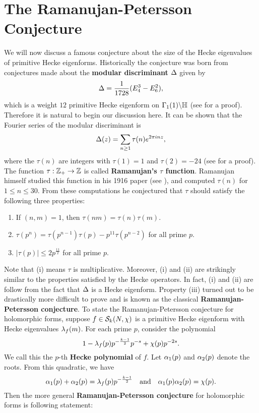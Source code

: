   \section{The Ramanujan-Petersson Conjecture}
    We will now discuss a famous conjecture about the size of the Hecke eigenvalues of primitive Hecke eigenforms. Historically the conjecture was born from conjectures made about the \textbf{modular discriminant} $\Delta$ given by
    \[
      \Delta = \frac{1}{1728}(E_{4}^{3}-E_{6}^{2}),
    \]
    which is a weight $12$ primitive Hecke eigenform on $\Gamma_{1}(1)\backslash\mathbb{H}$ (see \cite{diamond2005first} for a proof). Therefore it is natural to begin our discussion here. It can be shown that the Fourier series of the modular discriminant is
    \[
      \Delta(z) = \sum_{n \ge 1}\tau(n)e^{2\pi i nz},
    \]
    where the $\tau(n)$ are integers with $\tau(1) = 1$ and $\tau(2) = -24$ (see \cite{diamond2005first} for a proof). The function $\tau:\mathbb{Z}_{+} \to \mathbb{Z}$ is called \textbf{Ramanujan's $\tau$ function}. Ramanujan himself studied this function in his 1916 paper (see \cite{ramanujan1916certain}), and computed $\tau(n)$ for $1 \le n \le 30$. From these computations he conjectured that $\tau$ should satisfy the following three properties:
    \begin{enumerate}[label=(\roman*)]
      \item If $(n,m) = 1$, then $\tau(nm) = \tau(n)\tau(m)$.
      \item $\tau(p^{n}) = \tau(p^{n-1})\tau(p)-p^{11}\tau(p^{n-2})$ for all prime $p$.
      \item $|\tau(p)| \le 2p^{\frac{11}{2}}$ for all prime $p$.
    \end{enumerate}
    Note that (i) means $\tau$ is multiplicative. Moreover, (i) and (ii) are strikingly similar to the properties satisfied by the Hecke operators. In fact, (i) and (ii) are follow from the fact that $\Delta$ is a Hecke eigenform. Property (iii) turned out to be drastically more difficult to prove and is known as the classical \textbf{Ramanujan-Petersson conjecture}. To state the Ramanujan-Petersson conjecture for holomorphic forms, suppose $f \in \mathcal{S}_{k}(N,\chi)$ is a primitive Hecke eigenform with Hecke eigenvalues $\lambda_{f}(m)$. For each prime $p$, consider the polynomial
    \[
      1-\lambda_{f}(p)p^{-\frac{k-1}{2}}p^{-s}+\chi(p)p^{-2s}.
    \]
    We call this the $p$-th \textbf{Hecke polynomial} of $f$. Let $\alpha_{1}(p)$ and $\alpha_{2}(p)$ denote the roots. From this quadratic, we have
    \[
      \alpha_{1}(p)+\alpha_{2}(p) = \lambda_{f}(p)p^{-\frac{k-1}{2}} \quad \text{and} \quad \alpha_{1}(p)\alpha_{2}(p) = \chi(p).
    \]
    Then the more general \textbf{Ramanujan-Petersson conjecture} for holomorphic forms is following statement:

